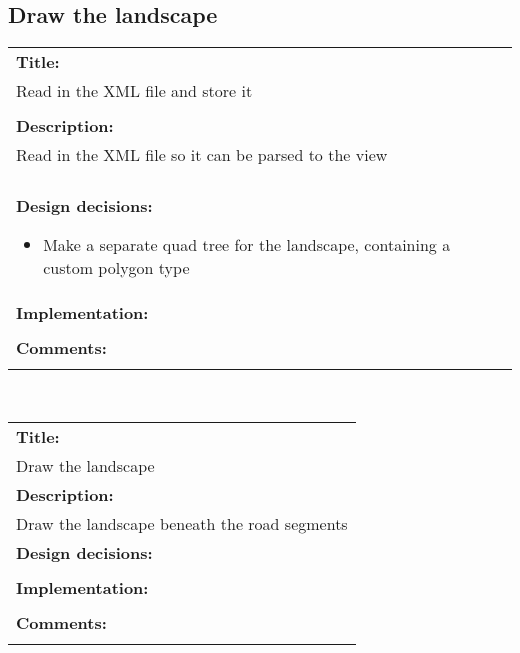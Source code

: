 \pagebreak

\subsection*{Draw the landscape}
\begin{tabular}{ | p{12cm} | }
	\hline
	\textbf{Title:} \\
	Read in the XML file and store it \\
	\\ \hline
	\textbf{Description:} \\
	Read in the XML file so it can be parsed to the view \\
	\\ \hline
	\textbf{Design decisions:}
	\begin{itemize}
		\item Make a separate quad tree for the landscape, containing a custom polygon type
	\end{itemize}
	\\ \hline
	\textbf{Implementation:} \\
	\\ \hline
	\textbf{Comments:} \\
	\\ \hline
\end{tabular} \\
\begin{tabular}{ | p{12cm} | }
	\hline
	\textbf{Title:} \\
	Draw the landscape
	\\ \hline
	\textbf{Description:} \\
	Draw the landscape beneath the road segments
	\\ \hline
	\textbf{Design decisions:} \\
	\\ \hline
	\textbf{Implementation:} \\
	\\ \hline
	\textbf{Comments:} \\
	\\ \hline
\end{tabular}